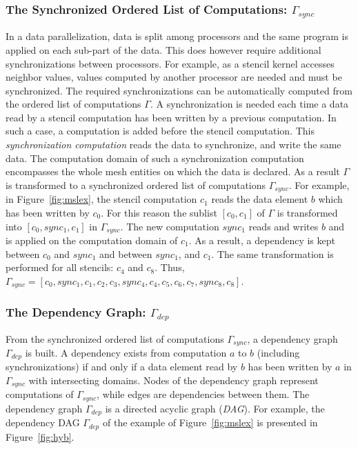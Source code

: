 \subsubsection*{The Synchronized Ordered List of Computations: $\Gamma_{sync}$}
In a data parallelization, data is split among processors and the same program is applied on each sub-part of the data.
This does however require additional synchronizations between processors.
For example, as a stencil kernel accesses neighbor values, values computed by another processor are needed and must be synchronized. 
The required synchronizations can be automatically computed from the ordered list of computations $\Gamma$.
A synchronization is needed each time a data read by a stencil computation has been written by a previous computation. In such a case, a computation is added before the stencil computation. This \emph{synchronization computation} reads the data to synchronize, and write the same data. The computation domain of such a synchronization computation encompasses the whole mesh entities on which the data is declared. As a result $\Gamma$ is transformed to a synchronized ordered list of computations $\Gamma_{sync}$.
For example, in Figure~\ref{fig:mslex}, the stencil computation $c_1$ reads the data element $b$ which has been written by $c_0$. For this reason the sublist $[c_0,c_1]$ of $\Gamma$ is transformed into $[c_0,sync_1,c_1]$ in $\Gamma_{sync}$. The new computation $sync_1$ reads and writes $b$ and is applied on the computation domain of $c_1$. As a result, a dependency is kept between $c_0$ and $sync_1$ and between $sync_1$, and $c_1$. The same transformation is performed for all stencils: $c_4$ and $c_8$. Thus, $\Gamma_{sync} = [c_0,sync_1,c_1,c_2,c_3,sync_4,c_4,c_5,c_6,c_7,sync_8,c_8]$.

\subsubsection*{The Dependency Graph: $\Gamma_{dep}$}
From the synchronized ordered list of computations $\Gamma_{sync}$, a dependency graph $\Gamma_{dep}$ is built.
A dependency exists from computation $a$ to $b$ (including synchronizations) if and only if a data element read by $b$ has been written by $a$ in $\Gamma_{sync}$ with intersecting domains.
Nodes of the dependency graph represent computations of $\Gamma_{sync}$, while edges are dependencies between them. The dependency graph $\Gamma_{dep}$ is a directed acyclic graph (\emph{DAG}). For example, the dependency DAG $\Gamma_{dep}$ of the example of Figure~\ref{fig:mslex} is presented in Figure~\ref{fig:hyb}.

